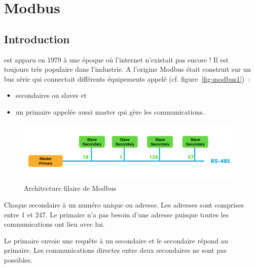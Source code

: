 





\chapter{Modbus}

\section{Introduction}
  
  est apparu en 1979 à une époque où l'internet n'existait pas encore ! Il est toujours très populaire dans l'industrie. A l'origine Modbus était construit sur un bus série  qui connectait différents équipements  appelé (cf. figure~\vref{fig-modbus1})~:
 \begin{itemize}
 \item secondaires ou slaves et 
 \item un primaire appelée aussi master qui gère les communications. 
 \end{itemize}
 
 
 
 \begin{figure}[tbp]
\centerline{\includegraphics[width=1\columnwidth]{Pictures/Capture35.png}}
\caption{Architecture filaire de Modbus}
\label{fig-modbus1}
\end{figure}

 
 
 Chaque secondaire à un numéro unique ou adresse. Les adresses sont comprises entre 1 et 247. Le primaire n'a pas besoin d'une adresse puisque toutes les communications ont lieu avec lui. 
 
   \vspace{1em}


 Le primaire envoie une requête à un secondaire et le secondaire répond au primaire. Les communications directes entre deux secondaires ne sont pas possibles. 
 
